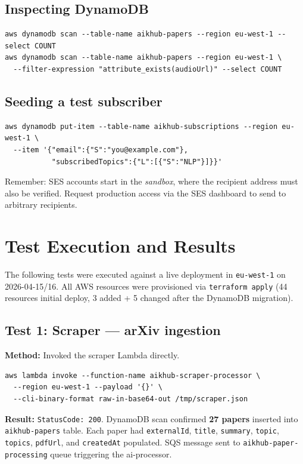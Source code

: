 \documentclass[11pt,a4paper]{article}
\begin{document}
\subsection{Inspecting DynamoDB}
\begin{lstlisting}[basicstyle=\ttfamily\small]
aws dynamodb scan --table-name aikhub-papers --region eu-west-1 --select COUNT
aws dynamodb scan --table-name aikhub-papers --region eu-west-1 \
  --filter-expression "attribute_exists(audioUrl)" --select COUNT
\end{lstlisting}

\subsection{Seeding a test subscriber}
\begin{lstlisting}[basicstyle=\ttfamily\small]
aws dynamodb put-item --table-name aikhub-subscriptions --region eu-west-1 \
  --item '{"email":{"S":"you@example.com"},
           "subscribedTopics":{"L":[{"S":"NLP"}]}}'
\end{lstlisting}

Remember: SES accounts start in the \emph{sandbox}, where the recipient address must also be verified. Request production access via the SES dashboard to send to arbitrary recipients.

\section{Test Execution and Results}

The following tests were executed against a live deployment in \texttt{eu-west-1} on 2026-04-15/16. All AWS resources were provisioned via \texttt{terraform apply} (44 resources initial deploy, 3 added + 5 changed after the DynamoDB migration).

\subsection{Test 1: Scraper --- arXiv ingestion}

\textbf{Method:} Invoked the scraper Lambda directly.
\begin{lstlisting}[basicstyle=\ttfamily\small]
aws lambda invoke --function-name aikhub-scraper-processor \
  --region eu-west-1 --payload '{}' \
  --cli-binary-format raw-in-base64-out /tmp/scraper.json
\end{lstlisting}

\textbf{Result:} \texttt{StatusCode: 200}. DynamoDB scan confirmed \textbf{27 papers} inserted into \texttt{aikhub-papers} table. Each paper had \texttt{externalId}, \texttt{title}, \texttt{summary}, \texttt{topic}, \texttt{topics}, \texttt{pdfUrl}, and \texttt{createdAt} populated. SQS message sent to \texttt{aikhub-paper-processing} queue triggering the ai-processor.
\end{document}
